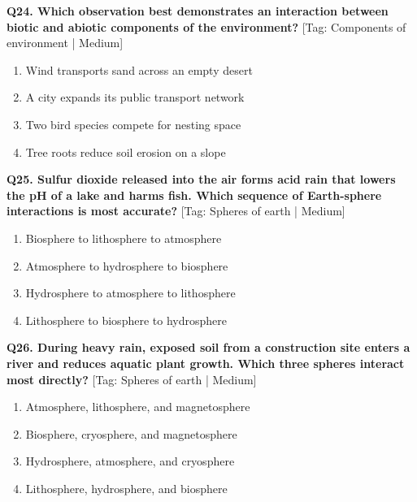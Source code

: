 \noindent\textbf{Q24. Which observation best demonstrates an interaction between biotic and abiotic components of the environment?} \hfill [Tag: Components of environment | Medium]
\begin{enumerate}[label=(\alph*),topsep=2pt,itemsep=1pt,partopsep=0pt,parsep=0pt]
    \item {Wind transports sand across an empty desert}
    \item {A city expands its public transport network}
    \item {Two bird species compete for nesting space}
    \item {Tree roots reduce soil erosion on a slope}
\end{enumerate}
\vspace{2mm}

\noindent\textbf{Q25. Sulfur dioxide released into the air forms acid rain that lowers the pH of a lake and harms fish. Which sequence of Earth-sphere interactions is most accurate?} \hfill [Tag: Spheres of earth | Medium]
\begin{enumerate}[label=(\alph*),topsep=2pt,itemsep=1pt,partopsep=0pt,parsep=0pt]
    \item {Biosphere to lithosphere to atmosphere}
    \item {Atmosphere to hydrosphere to biosphere}
    \item {Hydrosphere to atmosphere to lithosphere}
    \item {Lithosphere to biosphere to hydrosphere}
\end{enumerate}
\vspace{2mm}

\noindent\textbf{Q26. During heavy rain, exposed soil from a construction site enters a river and reduces aquatic plant growth. Which three spheres interact most directly?} \hfill [Tag: Spheres of earth | Medium]
\begin{enumerate}[label=(\alph*),topsep=2pt,itemsep=1pt,partopsep=0pt,parsep=0pt]
    \item {Atmosphere, lithosphere, and magnetosphere}
    \item {Biosphere, cryosphere, and magnetosphere}
    \item {Hydrosphere, atmosphere, and cryosphere}
    \item {Lithosphere, hydrosphere, and biosphere}
\end{enumerate}
\vspace{2mm}

